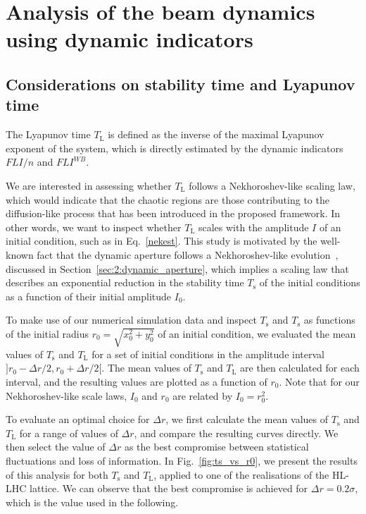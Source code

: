 \section{Analysis of the beam dynamics using dynamic indicators}\label{sec:8:detailed}

\subsection{Considerations on stability time and Lyapunov time}

The Lyapunov time $T_\mathrm{L}$ is defined as the inverse of the maximal Lyapunov exponent of the system, which is directly estimated by the dynamic indicators $FLI/n$ and $FLI^{{WB}}$.

We are interested in assessing whether $T_\mathrm{L}$ follows a Nekhoroshev-like scaling law, which would indicate that the chaotic regions are those contributing to the diffusion-like process that has been introduced in the proposed framework. In other words, we want to inspect whether $T_\mathrm{L}$ scales with the amplitude $I$ of an initial condition, such as in Eq.~\eqref{nekest}. This study is motivated by the well-known fact that the dynamic aperture follows a Nekhoroshev-like evolution~\cite{Bazzani:2019csk}, discussed in Section~\ref{sec:2:dynamic_aperture}, which implies a scaling law that describes an exponential reduction in the stability time $T_\mathrm{s}$ of the initial conditions as a function of their initial amplitude $I_0$.

To make use of our numerical simulation data and inspect $T_\mathrm{s}$ and $T_\mathrm{s}$ as functions of the initial radius $r_0 = \sqrt{x_0^2 + y_0^2}$ of an initial condition, we evaluated the mean values of $T_\mathrm{s}$ and $T_\mathrm{L}$ for a set of initial conditions in the amplitude interval $]r_0-\Delta r/2, r_0 +\Delta r/2[$. The mean values of $T_\mathrm{s}$ and $T_\mathrm{L}$ are then calculated for each interval, and the resulting values are plotted as a function of $r_0$. Note that for our Nekhoroshev-like scale laws, $I_0$ and $r_0$ are related by $I_0 = r_0^2$.

To evaluate an optimal choice for $\Delta r$, we first calculate the mean values of $T_\mathrm{s}$ and $T_\mathrm{L}$ for a range of values of $\Delta r$, and compare the resulting curves directly. We then select the value of $\Delta r$ as the best compromise between statistical fluctuations and loss of information. In Fig.~\ref{fig:ts_vs_r0}, we present the results of this analysis for both $T_\mathrm{s}$ and $T_\mathrm{L}$, applied to one of the realisations of the HL-LHC lattice. We can observe that the best compromise is achieved for $\Delta r = 0.2\sigma$, which is the value used in the following.

